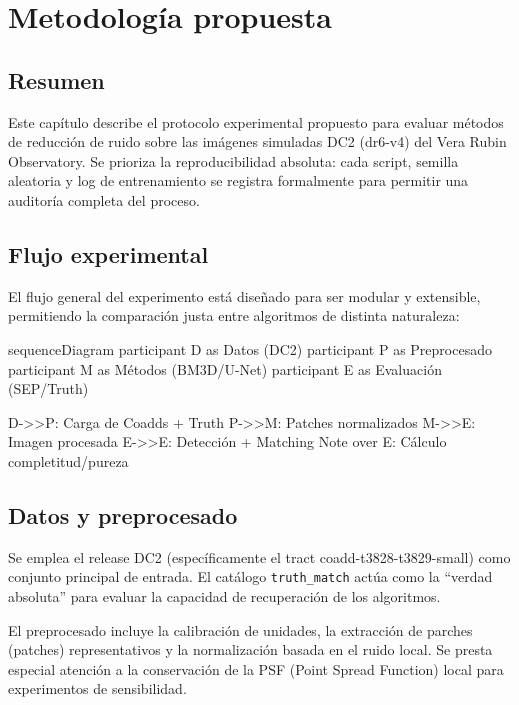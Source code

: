 \chapter{Metodolog\'ia propuesta}

\section{Resumen}

Este cap\'itulo describe el protocolo experimental propuesto para evaluar m\'etodos de reducci\'on de ruido sobre las im\'agenes simuladas DC2 (dr6-v4) del Vera Rubin Observatory. Se prioriza la reproducibilidad absoluta: cada script, semilla aleatoria y log de entrenamiento se registra formalmente para permitir una auditor\'ia completa del proceso.

\section{Flujo experimental}

El flujo general del experimento est\'a diseñado para ser modular y extensible, permitiendo la comparaci\'on justa entre algoritmos de distinta naturaleza:

\begin{mermaid}[width=0.9\linewidth, caption={Secuencia del flujo experimental de benchmarking}, pos=t]
sequenceDiagram
    participant D as Datos (DC2)
    participant P as Preprocesado
    participant M as Métodos (BM3D/U-Net)
    participant E as Evaluación (SEP/Truth)

    D->>P: Carga de Coadds + Truth
    P->>M: Patches normalizados
    M->>E: Imagen procesada
    E->>E: Detección + Matching
    Note over E: Cálculo completitud/pureza
\end{mermaid}

\section{Datos y preprocesado}

Se emplea el release DC2 (espec\'ificamente el tract coadd-t3828-t3829-small) como conjunto principal de entrada. El cat\'alogo \texttt{truth\_match} act\'ua como la ``verdad absoluta'' para evaluar la capacidad de recuperaci\'on de los algoritmos.

El preprocesado incluye la calibraci\'on de unidades, la extracci\'on de parches (patches) representativos y la normalizaci\'on basada en el ruido local. Se presta especial atenci\'on a la conservaci\'on de la PSF (Point Spread Function) local para experimentos de sensibilidad.

